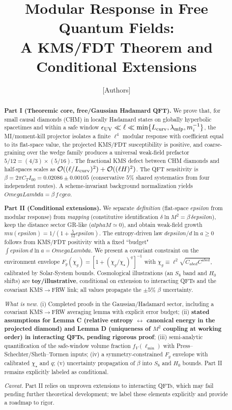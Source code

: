 \documentclass[aps,prd,onecolumn,superscriptaddress,nofootinbib]{revtex4-2}
\def\OmL{OmegaLambda}%
\def\cgeo{cgeo}%
\def\eps{epsilon}%
\def\mu{mu}%
\def\alpha{alpha}%
\def\alpha_M{alphaM}%
\def\Omega_\Lambda{OmegaLambda}%
\providecommand{\OmL}{\Omega_\Lambda}
\providecommand{\cgeo}{c_{\rm geo}}
\providecommand{\eps}{\varepsilon}
\begin{document}
\title{Modular Response in Free Quantum Fields:\\
A KMS/FDT Theorem and Conditional Extensions}

\author{[Authors]}
\affiliation{[Institutions]}
\date{}

\begin{abstract}
\textbf{Part I (Theoremic core, free/Gaussian Hadamard QFT).} We prove that, for small causal diamonds (CHM) in locally Hadamard states on globally hyperbolic spacetimes and within a safe window \(\epsilon_{\rm UV}\ll\ell\ll \min\{L_{\rm curv},\lambda_{\rm mfp},m_i^{-1}\}\), the MI/moment-kill projector isolates a finite \(\ell^4\) modular response with coefficient equal to its flat-space value, the projected KMS/FDT susceptibility is positive, and coarse-graining over the wedge family produces a universal weak-field prefactor \(5/12=(4/3)\times(5/16)\). The fractional KMS defect between CHM diamonds and half-spaces scales as \(\mathcal O((\ell/L_{\rm curv})^2)+\mathcal O((\ell H)^2)\). The QFT sensitivity is \(\beta=2\pi C_T I_{00}=0.02086\pm 0.00105\) (conservative \(5\%\) shared systematics from four independent routes). A scheme-invariant background normalization yields \(\OmL=\beta\, f\,\cgeo\).

\smallskip
\textbf{Part II (Conditional extensions).} We separate \emph{definition} (flat-space \(\eps\) from modular response) from \emph{mapping} (constitutive identification \(\delta\ln M^2=\beta\,\delta\eps\)), keep the distance sector GR-like (\(\alpha_M\simeq 0\)), and obtain weak-field growth \(\mu(\eps)=1/(1+\tfrac{5}{12}\eps)\). The entropy-driven law \(d\eps/d\ln a\ge 0\) follows from KMS/FDT positivity with a fixed ``budget" \(\int \eps\,d\ln a=\OmL\). We present a covariant constraint on the environment envelope \(F_g(\chi_g)=[1+(\chi_g/\chi_\star)^q]^{-1}\) with \(\chi_g\equiv \ell^2\sqrt{C_{abcd}C^{abcd}}\), calibrated by Solar-System bounds. Cosmological illustrations (an \(S_8\) band and \(H_0\) shifts) are \textbf{toy/illustrative}, conditional on extension to interacting QFTs and the covariant KMS\(\to\)FRW link; all values propagate the \(\pm5\%\) \(\beta\) uncertainty.

\smallskip
\emph{What is new.} (i) Completed proofs in the Gaussian/Hadamard sector, including a covariant KMS\(\to\)FRW averaging lemma with explicit error budget; (ii) \textbf{stated assumptions for Lemma C (relative entropy \(\leftrightarrow\) canonical energy in the projected diamond) and Lemma D (uniqueness of \(M^2\) coupling at working order) in interacting QFTs, pending rigorous proof}; (iii) semi-analytic quantification of the safe-window volume fraction \(f_V(\ell_{\min})\) with Press--Schechter/Sheth--Tormen inputs; (iv) a symmetry-constrained \(F_g\) envelope with calibrated \(\chi_\star\) and \(q\); (v) uncertainty propagation of \(\beta\) into \(S_8\) and \(H_0\) bounds. Part II remains explicitly labeled as conditional.

\smallskip
\emph{Caveat.} Part II relies on unproven extensions to interacting QFTs, which may fail pending further theoretical development; we label these elements explicitly and provide a roadmap to rigor.
\end{abstract}
\end{document}
